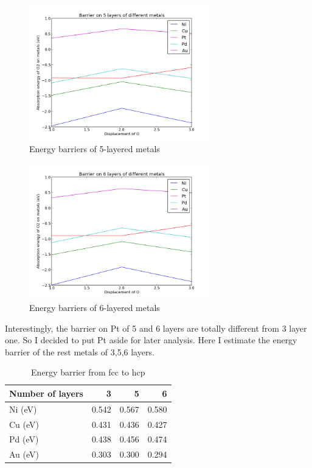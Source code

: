 \documentclass[11pt]{article}
\begin{document}
\begin{figure}[H]
\centering
\includegraphics[width=0.7\textwidth]{./images/barrier-5.png}
\caption{Energy barriers of 5-layered metals}
\end{figure}

\begin{figure}[H]
\centering
\includegraphics[width=0.7\textwidth]{./images/barrier-6.png}
\caption{Energy barriers of 6-layered metals}
\end{figure}

Interestingly, the barrier on Pt of 5 and 6 layers are totally different from 3 layer one. So I decided to put Pt aside for later analysis. Here I estimate the energy barrier of the rest metals of 3,5,6 layers.

\begin{table}[H]
\caption{Energy barrier from fcc to hcp}
\begin{center}
\begin{tabular}{lrrr}
 Number of layers  &      3  &      5  &      6  \\
\hline
 Ni (eV)           &  0.542  &  0.567  &  0.580  \\
 Cu (eV)           &  0.431  &  0.436  &  0.427  \\
 Pd (eV)           &  0.438  &  0.456  &  0.474  \\
 Au (eV)           &  0.303  &  0.300  &  0.294  \\
\end{tabular}
\end{center}
\end{table}
\end{document}
